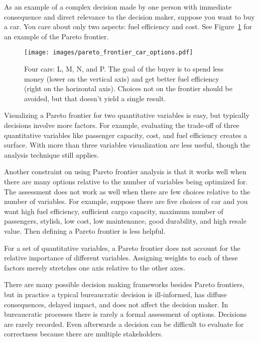 As an example of a complex decision made by one person with immediate consequence and direct relevance to the decision maker, suppose you want to buy a car. You care about only two aspects: fuel efficiency and cost. See Figure~\ref{fig:pareto_frontier_cars} for an example of the Pareto frontier.

\begin{figure}[ht]
    \centering
    \texttt{[image: images/pareto\_frontier\_car\_options.pdf]}
    \caption{Four cars: L, M, N, and P. The goal of the buyer is to spend less money (lower on the vertical axis) and get better fuel efficiency (right on the horizontal axis). Choices not on the frontier should be avoided, but that doesn't yield a single result.}
    \label{fig:pareto_frontier_cars}
\end{figure}

Visualizing a Pareto frontier for two quantitative variables is easy, but typically decisions involve more factors. For example, evaluating the trade-off of three quantitative variables like 
passenger capacity, cost, and fuel efficiency creates a surface. With more than three variables visualization are less useful, though the analysis technique still applies. 

Another constraint on using Pareto frontier analysis is that it works well when there are many options relative to the number of variables being optimized for. 
The assessment does not work as well when there are few choices relative to the number of variables. For example, suppose there are five choices of car and you want high fuel efficiency, sufficient cargo capacity, maximum number of passengers, stylish, low cost, low maintenance, good durability, and high resale value. Then defining a Pareto frontier is less helpful.

For a set of quantitative variables, a Pareto frontier does not account for the relative importance of different variables. Assigning weights to each of these factors merely stretches one axis relative to the other axes. 

There are many possible decision making frameworks besides Pareto frontiers, but in practice a typical bureaucratic decision is ill-informed, has diffuse consequences, delayed impact, and does not affect the decision maker. In bureaucratic processes there is rarely a formal assessment of options. 
Decisions are rarely recorded. 
Even afterwards a decision can be difficult to evaluate for correctness because there are multiple stakeholders.


